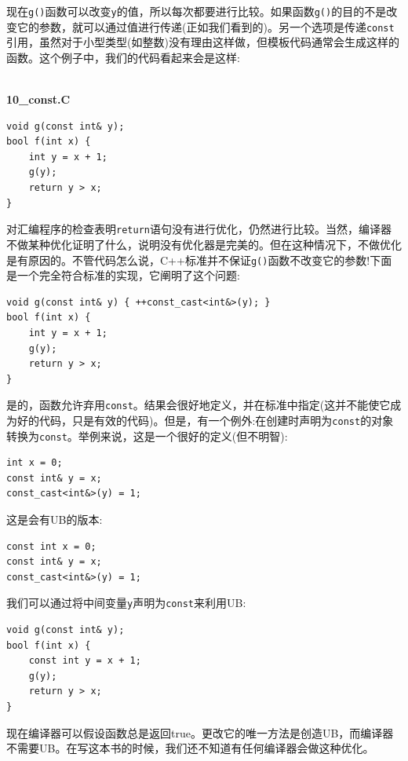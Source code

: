 现在\texttt{g()}函数可以改变\texttt{y}的值，所以每次都要进行比较。如果函数\texttt{g()}的目的不是改变它的参数，就可以通过值进行传递(正如我们看到的)。另一个选项是传递\texttt{const}引用，虽然对于小型类型(如整数)没有理由这样做，但模板代码通常会生成这样的函数。这个例子中，我们的代码看起来会是这样:

\hspace*{\fill} \\ %
\noindent
\textbf{10\_const.C}
\begin{lstlisting}[style=styleCXX]
void g(const int& y);
bool f(int x) {
	int y = x + 1;
	g(y);
	return y > x;
}
\end{lstlisting}

对汇编程序的检查表明\texttt{return}语句没有进行优化，仍然进行比较。当然，编译器不做某种优化证明了什么，说明没有优化器是完美的。但在这种情况下，不做优化是有原因的。不管代码怎么说，C++标准并不保证\texttt{g()}函数不改变它的参数!下面是一个完全符合标准的实现，它阐明了这个问题:

\begin{lstlisting}[style=styleCXX]
void g(const int& y) { ++const_cast<int&>(y); }
bool f(int x) {
	int y = x + 1;
	g(y);
	return y > x;
}
\end{lstlisting}

是的，函数允许弃用\texttt{const}。结果会很好地定义，并在标准中指定(这并不能使它成为好的代码，只是有效的代码)。但是，有一个例外:在创建时声明为\texttt{const}的对象转换为\texttt{const}。举例来说，这是一个很好的定义(但不明智):

\begin{lstlisting}[style=styleCXX]
int x = 0;
const int& y = x;
const_cast<int&>(y) = 1;
\end{lstlisting}

这是会有UB的版本:

\begin{lstlisting}[style=styleCXX]
const int x = 0;
const int& y = x;
const_cast<int&>(y) = 1;
\end{lstlisting}

我们可以通过将中间变量\texttt{y}声明为\texttt{const}来利用UB:

\begin{lstlisting}[style=styleCXX]
void g(const int& y);
bool f(int x) {
	const int y = x + 1;
	g(y);
	return y > x;
}
\end{lstlisting}

现在编译器可以假设函数总是返回true。更改它的唯一方法是创造UB，而编译器不需要UB。在写这本书的时候，我们还不知道有任何编译器会做这种优化。

